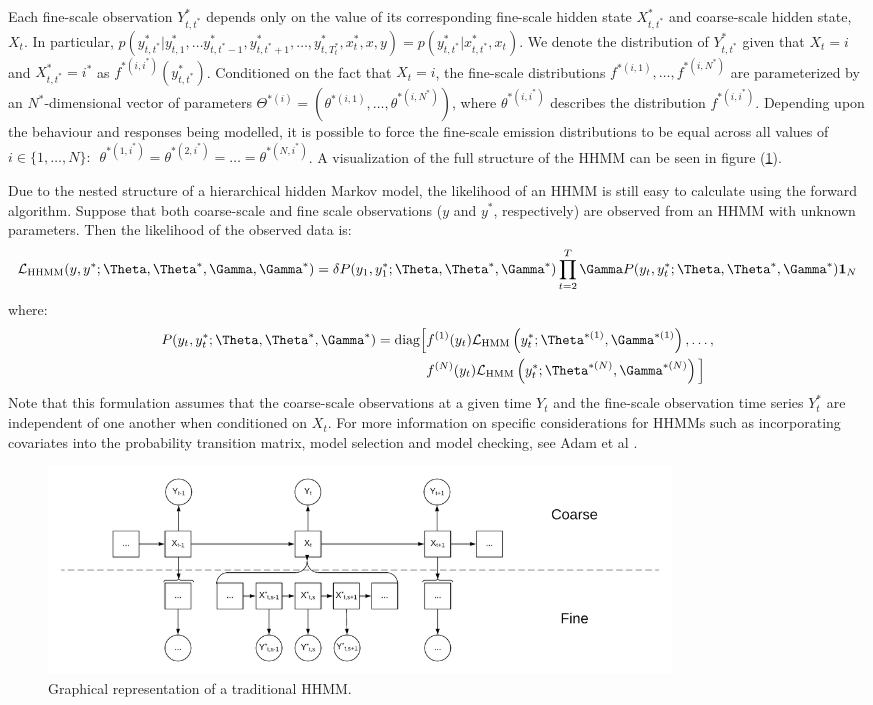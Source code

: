 Each fine-scale observation $Y^*_{t,t^*}$ depends only on the value of its corresponding fine-scale hidden state $X^*_{t,t^*}$ and coarse-scale hidden state, $X_t$. In particular, $p(y^*_{t,t^*} | y^*_{t,1}, \ldots y^*_{t,t^*-1},y^*_{t,t^*+1},\ldots,y^*_{t,T^*_t},x^*_t,x,y) = p(y^*_{t,t^*}|x^*_{t,t^*},x_t)$. We denote the distribution of $Y^*_{t,t^*}$ given that $X_t = i$ and $X^*_{t,t^*} = i^*$ as $f^{*(i,i^*)}(y^*_{t,t^*})$. Conditioned on the fact that $X_t = i$, the fine-scale distributions $f^{*(i,1)}, \ldots, f^{*(i,N^*)}$ are parameterized by an $N^*$-dimensional vector of parameters $\Theta^{*(i)} = (\theta^{*(i,1)},\ldots,\theta^{*(i,N^*)})$, where $\theta^{*(i,i^*)}$ describes the distribution $f^{*(i,i^*)}$. Depending upon the behaviour and responses being modelled, it is possible to force the fine-scale emission distributions to be equal across all values of $i \in \{1, \ldots, N\}: \enspace \theta^{*(1,i^*)} = \theta^{*(2,i^*)} = \ldots = \theta^{*(N,i^*)}$. A visualization of the full structure of the HHMM can be seen in figure (\ref{fig:HHMM}). 

Due to the nested structure of a hierarchical hidden Markov model, the likelihood of an HHMM is still easy to calculate using the forward algorithm. Suppose that both coarse-scale and fine scale observations ($y$ and $y^*$, respectively) are observed from an HHMM with unknown parameters. Then the likelihood of the observed data is:
%
$$\calL_{\text{HHMM}}(y,y^*;\Theta,\Theta^*,\Gamma,\Gamma^*) = \delta P(y_1,y_1^*;\Theta,\Theta^*,\Gamma^*) \prod_{t=2}^T \Gamma P(y_t,y_t^*;\Theta,\Theta^*,\Gamma^*) \mathbf{1}_N$$
%
where:
%
\begin{align*}
	P(y_t,y_t^*;\Theta,\Theta^*,\Gamma^*) = \text{diag}\Big[&f^{(1)}(y_t)\calL_{\text{HMM}}\left(y_t^*;\Theta^{*(1)},\Gamma^{*(1)}\right),\ldots, \\
	&f^{(N)}(y_t)\calL_{\text{HMM}}\left(y_t^*;\Theta^{*(N)},\Gamma^{*(N)}\right) \Big]
\end{align*}
%
Note that this formulation assumes that the coarse-scale observations at a given time $Y_t$ and the fine-scale observation time series $Y_t^*$ are independent of one another when conditioned on $X_t$. For more information on specific considerations for HHMMs such as incorporating covariates into the probability transition matrix, model selection and model checking, see Adam et al \cite{Adam:2019}.

\begin{figure}[h!]
	\centering
	\includegraphics[width=6.5in]{../Plots/HHMM.png}
	\caption{Graphical representation of a traditional HHMM.}
	\label{fig:HHMM}
\end{figure}


